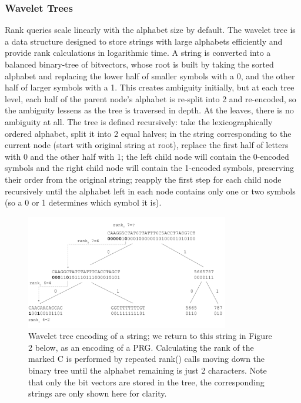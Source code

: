 \documentclass[runningheads,a4paper]{llncs}
\begin{document}
\subsubsection{Wavelet Trees}
Rank queries scale linearly with the alphabet size by default. The wavelet tree \cite{wt} is a data structure designed to store strings with large alphabets efficiently and provide rank calculations in logarithmic time. A string is converted into a balanced binary-tree of bitvectors, whose root is built by taking the sorted alphabet and replacing the lower half of smaller symbols with a 0, and the other half of larger symbols with a 1. This creates ambiguity initially, but at each tree level, each half of the parent node's alphabet is re-split into 2 and re-encoded, so the ambiguity lessens as the tree is traversed in depth. At the leaves, there is no ambiguity at all. The tree is defined recursively: take the lexicographically ordered alphabet, split it into 2 equal halves; in the string corresponding to the current node (start with original string at root), replace the first half of letters with 0 and the other half with 1; the left child node will contain the 0-encoded symbols and the right child node will contain the 1-encoded symbols, preserving their order from the original string; reapply the first step for each child node recursively until the alphabet left in each node contains only one or two symbols (so a 0 or 1 determines which symbol it is).

 \begin{figure}
\centering
\includegraphics[height=5cm]{wavelet_tree.png}
\caption{Wavelet tree encoding of a string; we return to this string in Figure 2 below, as an encoding of a PRG. Calculating the rank of the marked C is performed by repeated rank() calls moving down the binary tree until the alphabet remaining is just 2 characters. Note that only the bit vectors are stored in the tree, the corresponding strings are only shown here for clarity. }
\label{fig:wt}
\end{figure}
\end{document}
